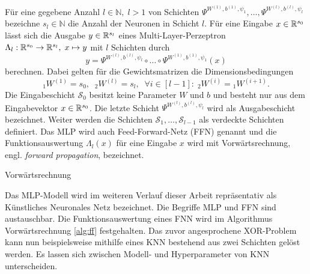\begin{defi}
    \label{def:MLP}
    Für eine gegebene Anzahl $l \in \mathbb{N}, \; l>1$ von Schichten $\Psi^{W^{(1)},b^{(1)},\psi_{1}}, \ldots, \Psi^{W^{(l)},b^{(l)},\psi_{l}}$ bezeichne $s_l \in \mathbb{N}$ die Anzahl der Neuronen in Schicht $l$. Für eine Eingabe $x \in \mathbb{R}^{s_0}$ lässt sich die Ausgabe $y \in \mathbb{R}^{s_l}$ eines Multi-Layer-Perzeptron  $\Lambda_l: \mathbb{R}^{s_0} \rightarrow \mathbb{R}^{s_l}, \; x \mapsto y$ mit $l$ Schichten durch
    \[
        y=\Psi^{W^{(l)},b^{(l)},\psi_{l}} \circ \ldots \circ \Psi^{W^{(1)},b^{(1)},\psi_{1}}(x)
    \]
    berechnen. Dabei gelten für die Gewichtsmatrizen die Dimensionsbedingungen
    \[{}_1W^{(1)}=s_0, \; \; {}_2W^{(l)}=s_l, \; \; \forall i \in [l-1]: \; {}_2W^{(i)}={}_1W^{(i+1)}.
        \] 
    Die Eingabeschicht $\mathcal{S}_0$ besitzt keine Parameter $W$ und $b$ und besteht nur aus dem Eingabevektor $x \in \mathbb{R}^{s_0}$. Die letzte Schicht $\Psi^{W^{(l)},b^{(l)},\psi_{l}}$ wird als Ausgabeschicht bezeichnet. Weiter werden die Schichten $\mathcal{S}_1, \ldots, \mathcal{S}_{l-1}$ als verdeckte Schichten definiert. Das MLP wird auch Feed-Forward-Netz (FFN)  genannt und die Funktionsauswertung $\Lambda_l(x)$ für eine Eingabe $x$ wird mit Vorwärtsrechnung, engl. \textit{forward propagation}, bezeichnet.
\end{defi}

\begin{algorithm}
    \caption{Vorwärtsrechnung}\label{alg:ff}
\end{algorithm}
    


Das MLP-Modell wird im weiteren Verlauf dieser Arbeit repräsentativ als Künstliches Neuronales Netz bezeichnet. Die Begriffe MLP und FFN sind austauschbar. Die Funktionsauswertung eines FNN wird im Algorithmus Vorwärtsrechnung \ref{alg:ff} festgehalten. Das zuvor angesprochene XOR-Problem kann nun beispielsweise mithilfe eines KNN bestehend aus zwei Schichten gelöst werden\cite{Goodfellow-et-al-2016}.
Es lassen sich zwischen Modell- und Hyperparameter von KNN unterscheiden.

